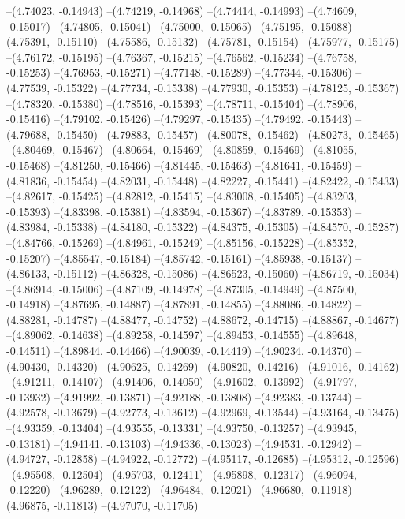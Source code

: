 --(4.74023, -0.14943)
--(4.74219, -0.14968)
--(4.74414, -0.14993)
--(4.74609, -0.15017)
--(4.74805, -0.15041)
--(4.75000, -0.15065)
--(4.75195, -0.15088)
--(4.75391, -0.15110)
--(4.75586, -0.15132)
--(4.75781, -0.15154)
--(4.75977, -0.15175)
--(4.76172, -0.15195)
--(4.76367, -0.15215)
--(4.76562, -0.15234)
--(4.76758, -0.15253)
--(4.76953, -0.15271)
--(4.77148, -0.15289)
--(4.77344, -0.15306)
--(4.77539, -0.15322)
--(4.77734, -0.15338)
--(4.77930, -0.15353)
--(4.78125, -0.15367)
--(4.78320, -0.15380)
--(4.78516, -0.15393)
--(4.78711, -0.15404)
--(4.78906, -0.15416)
--(4.79102, -0.15426)
--(4.79297, -0.15435)
--(4.79492, -0.15443)
--(4.79688, -0.15450)
--(4.79883, -0.15457)
--(4.80078, -0.15462)
--(4.80273, -0.15465)
--(4.80469, -0.15467)
--(4.80664, -0.15469)
--(4.80859, -0.15469)
--(4.81055, -0.15468)
--(4.81250, -0.15466)
--(4.81445, -0.15463)
--(4.81641, -0.15459)
--(4.81836, -0.15454)
--(4.82031, -0.15448)
--(4.82227, -0.15441)
--(4.82422, -0.15433)
--(4.82617, -0.15425)
--(4.82812, -0.15415)
--(4.83008, -0.15405)
--(4.83203, -0.15393)
--(4.83398, -0.15381)
--(4.83594, -0.15367)
--(4.83789, -0.15353)
--(4.83984, -0.15338)
--(4.84180, -0.15322)
--(4.84375, -0.15305)
--(4.84570, -0.15287)
--(4.84766, -0.15269)
--(4.84961, -0.15249)
--(4.85156, -0.15228)
--(4.85352, -0.15207)
--(4.85547, -0.15184)
--(4.85742, -0.15161)
--(4.85938, -0.15137)
--(4.86133, -0.15112)
--(4.86328, -0.15086)
--(4.86523, -0.15060)
--(4.86719, -0.15034)
--(4.86914, -0.15006)
--(4.87109, -0.14978)
--(4.87305, -0.14949)
--(4.87500, -0.14918)
--(4.87695, -0.14887)
--(4.87891, -0.14855)
--(4.88086, -0.14822)
--(4.88281, -0.14787)
--(4.88477, -0.14752)
--(4.88672, -0.14715)
--(4.88867, -0.14677)
--(4.89062, -0.14638)
--(4.89258, -0.14597)
--(4.89453, -0.14555)
--(4.89648, -0.14511)
--(4.89844, -0.14466)
--(4.90039, -0.14419)
--(4.90234, -0.14370)
--(4.90430, -0.14320)
--(4.90625, -0.14269)
--(4.90820, -0.14216)
--(4.91016, -0.14162)
--(4.91211, -0.14107)
--(4.91406, -0.14050)
--(4.91602, -0.13992)
--(4.91797, -0.13932)
--(4.91992, -0.13871)
--(4.92188, -0.13808)
--(4.92383, -0.13744)
--(4.92578, -0.13679)
--(4.92773, -0.13612)
--(4.92969, -0.13544)
--(4.93164, -0.13475)
--(4.93359, -0.13404)
--(4.93555, -0.13331)
--(4.93750, -0.13257)
--(4.93945, -0.13181)
--(4.94141, -0.13103)
--(4.94336, -0.13023)
--(4.94531, -0.12942)
--(4.94727, -0.12858)
--(4.94922, -0.12772)
--(4.95117, -0.12685)
--(4.95312, -0.12596)
--(4.95508, -0.12504)
--(4.95703, -0.12411)
--(4.95898, -0.12317)
--(4.96094, -0.12220)
--(4.96289, -0.12122)
--(4.96484, -0.12021)
--(4.96680, -0.11918)
--(4.96875, -0.11813)
--(4.97070, -0.11705)
